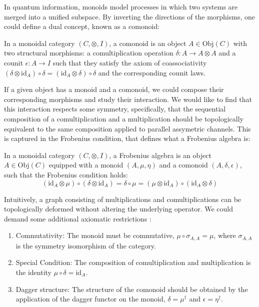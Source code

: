 \documentclass[12pt, twoside, openany]{book}
\begin{document}
In quantum information, monoids model processes in which two systems are merged into a unified subspace. By inverting the directions of the morphisms, one could define a dual concept, known as a comonoid:

\begin{definition}
    In a monoidal category $(C, \otimes, I)$, a comonoid is an object $A \in \text{Obj}(C)$ with two structural morphisms: a comultiplication operation $\delta: A \rightarrow A \otimes A$ and a counit $\epsilon : A \rightarrow I$ such that they satisfy the axiom of coassociativity $(\delta \otimes \text{id}_A) \circ \delta = (\text{id}_A \otimes \delta) \circ \delta$ and the corresponding counit laws. 
\end{definition}

If a given object has a monoid and a comonoid, we could compose their corresponding morphisms and study their interaction. We would like to find that this interaction respects some symmetry, specifically, that the sequential composition of a comultiplication and a multiplication should be topologically equivalent to the same composition applied to parallel assymetric channels. This is captured in the Frobenius condition, that defines what a Frobenius algebra is:

\begin{definition}
     In a monoidal category $(C, \otimes, I)$, a Frobenius algebra is an object $A \in \text{Obj}(C)$ equipped with a monoid $(A, \mu, \eta)$ and a comonoid $(A, \delta, \epsilon)$, such that the Frobenius condition holds:
     \begin{equation}
        (\text{id}_A \otimes \mu) \circ (\delta \otimes \text{id}_A) = \delta \circ \mu = (\mu \otimes \text{id}_A) \circ (\text{id}_A \otimes \delta)
     \end{equation}
\end{definition}

Intuitively, a graph consisting of multiplications and comultiplications can be topologically deformed without altering the underlying operator. We could demand some additional axiomatic restrictions \cite{coecke2009classicalquantumstructuralism}:
\begin{enumerate}
    \item Commutativity: The monoid must be commutative, $\mu \circ \sigma_{A,A} = \mu$, where $\sigma_{A,A}$ is the symmetry isomorphism of the category.
    \item Special Condition: The composition of comultiplication and multiplication is the identity $\mu \circ \delta = \text{id}_A$.
    \item Dagger structure: The structure of the comonoid should be obtained by the application of the dagger functor on the monoid, $\delta = \mu^\dagger$ and $\epsilon = \eta^\dagger$.
\end{enumerate}
\end{document}
